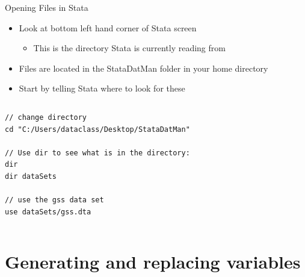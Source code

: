 \documentclass[table,smaller]{beamer}
\begin{document}
\begin{frame}[fragile,label=sec-1-4]{Opening Files in Stata}
 \begin{itemize}
\item Look at bottom left hand corner of Stata screen
\begin{itemize}
\item This is the directory Stata is currently reading from
\end{itemize}
\item Files are located in the StataDatMan folder in your home directory
\item Start by telling Stata where to look for these
\end{itemize}
\vspace{-.5em} \begin{columns}  \begin{block}{}
\begin{verbatim}
// change directory
cd "C:/Users/dataclass/Desktop/StataDatMan"

// Use dir to see what is in the directory:
dir
dir dataSets

// use the gss data set
use dataSets/gss.dta
\end{verbatim}
\end{block} \end{columns}
\end{frame}
\section{Generating and replacing variables}
\label{sec-2}
\end{document}
